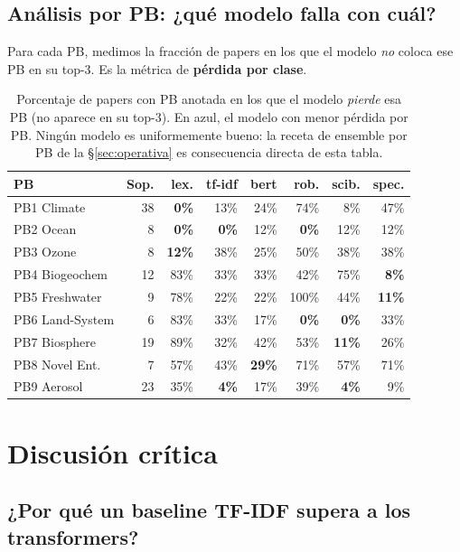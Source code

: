 \documentclass[11pt,a4paper]{article}
\newcommand{\good}[1]{\textbf{\textcolor{accent}{#1}}}
\begin{document}
\subsection{Análisis por PB: ¿qué modelo falla con cuál?}

Para cada PB, medimos la fracción de papers en los que el modelo \emph{no} coloca ese PB en su top-3. Es la métrica de \textbf{pérdida por clase}.

\begin{table}[h]
\centering
\small
\begin{tabular}{lr|rrrrrr}
\toprule
\textbf{PB} & \textbf{Sop.} & \textbf{lex.} & \textbf{tf-idf} & \textbf{bert} & \textbf{rob.} & \textbf{scib.} & \textbf{spec.} \\
\midrule
PB1 Climate & 38 & \good{0\%} & 13\% & 24\% & 74\% & 8\% & 47\% \\
PB2 Ocean & 8 & \good{0\%} & \good{0\%} & 12\% & \good{0\%} & 12\% & 12\% \\
PB3 Ozone & 8 & \good{12\%} & 38\% & 25\% & 50\% & 38\% & 38\% \\
PB4 Biogeochem & 12 & 83\% & 33\% & 33\% & 42\% & 75\% & \good{8\%} \\
PB5 Freshwater & 9 & 78\% & 22\% & 22\% & 100\% & 44\% & \good{11\%} \\
PB6 Land-System & 6 & 83\% & 33\% & 17\% & \good{0\%} & \good{0\%} & 33\% \\
PB7 Biosphere & 19 & 89\% & 32\% & 42\% & 53\% & \good{11\%} & 26\% \\
PB8 Novel Ent. & 7 & 57\% & 43\% & \good{29\%} & 71\% & 57\% & 71\% \\
PB9 Aerosol & 23 & 35\% & \good{4\%} & 17\% & 39\% & \good{4\%} & 9\% \\
\bottomrule
\end{tabular}
\caption{Porcentaje de papers con PB anotada en los que el modelo \emph{pierde} esa PB (no aparece en su top-3). En azul, el modelo con menor pérdida por PB. Ningún modelo es uniformemente bueno: la receta de ensemble por PB de la §\ref{sec:operativa} es consecuencia directa de esta tabla.}
\label{tab:errores_pb}
\end{table}

\section{Discusión crítica}\label{sec:discusion}

\subsection{¿Por qué un baseline TF-IDF supera a los transformers?}
\end{document}
